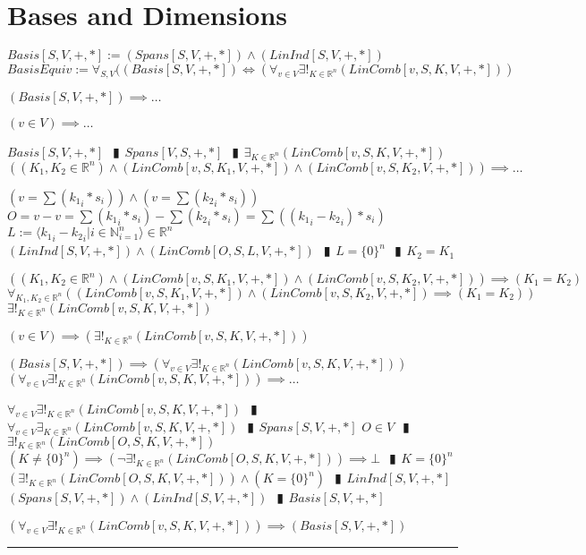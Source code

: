 \documentclass{book}
\newcommand{\abr}{:=}
\newcommand{\pipe}{$\phantom{(}\vrectangleblack\phantom{)}$}
\begin{document}
\section{Bases and Dimensions}
$Basis[S, V, +, *] \abr (Spans[S, V, +, *]) \land (LinInd[S, V, +, *])$ \\

$BasisEquiv \abr \forall_{S, V}((Basis[S, V, +, *]) \iff (\forall_{v \in V} \exists!_{K \in \mathbb{R}^n}(LinComb[v, S, K, V, +, *]))$
\begin{enumerate}
  \lit $(Basis[S, V, +, *]) \implies \ldots$
  \begin{enumerate}
    \lit $(v \in V) \implies \ldots$
    \begin{enumerate}
      \lit $Basis[S, V, +, *]$ \pipe $Spans[V, S, +, *]$ \pipe $\exists_{K \in \mathbb{R}^n}(LinComb[v, S, K, V, +, *])$
      \lit $((K_1, K_2 \in \mathbb{R}^n) \land (LinComb[v, S, K_1, V, +, *]) \land (LinComb[v, S, K_2, V, +, *])) \implies \ldots$
      \begin{enumerate}
        \lit $(v = \sum({k_1}_i * s_i)) \land (v = \sum({k_2}_i * s_i))$
        \lit $O = v - v = \sum({k_1}_i * s_i) - \sum({k_2}_i * s_i) = \sum(({k_1}_i - {k_2}_i) * s_i)$
        \lit $L \abr \langle {k_1}_i - {k_2}_i | i \in \mathbb{N}_{i = 1}^n \rangle \in \mathbb{R}^n$
        \lit $(LinInd[S, V, +, *]) \land (LinComb[O, S, L, V, +, *])$ \pipe $L = \{0\}^n$ \pipe $K_2 = K_1$
      \end{enumerate}
      \lit $((K_1, K_2 \in \mathbb{R}^n) \land (LinComb[v, S, K_1, V, +, *]) \land (LinComb[v, S, K_2, V, +, *])) \implies (K_1 = K_2)$
      \lit $\forall_{K_1, K_2 \in \mathbb{R}^n}((LinComb[v, S, K_1, V, +, *]) \land (LinComb[v, S, K_2, V, +, *]) \implies (K_1 = K_2))$
      \lit $\exists!_{K \in \mathbb{R}^n}(LinComb[v, S, K, V, +, *])$
    \end{enumerate}
    \lit $(v \in V) \implies (\exists!_{K \in \mathbb{R}^n}(LinComb[v, S, K, V, +, *]))$
    \end{enumerate}
  \lit $(Basis[S, V, +, *]) \implies (\forall_{v \in V} \exists!_{K \in \mathbb{R}^n}(LinComb[v, S, K, V, +, *]))$
  \lit $(\forall_{v \in V} \exists!_{K \in \mathbb{R}^n}(LinComb[v, S, K, V, +, *])) \implies \ldots$
  \begin{enumerate}
    \lit $\forall_{v \in V} \exists!_{K \in \mathbb{R}^n}(LinComb[v, S, K, V, +, *])$ \pipe $\forall_{v \in V} \exists_{K \in \mathbb{R}^n}(LinComb[v, S, K, V, +, *])$ \pipe $Spans[S, V, +, *]$
    \lit $O \in V$ \pipe $\exists!_{K \in \mathbb{R}^n}(LinComb[O, S, K, V, +, *])$
    \lit $(K \neq \{0\}^n) \implies (\lnot \exists!_{K \in \mathbb{R}^n}(LinComb[O, S, K, V, +, *])) \implies \bot$ \pipe $K = \{0\}^n$
    \lit $(\exists!_{K \in \mathbb{R}^n}(LinComb[O, S, K, V, +, *])) \land (K = \{0\}^n)$ \pipe $LinInd[S, V, +, *]$
    \lit $(Spans[S, V, +, *]) \land (LinInd[S, V, +, *])$ \pipe $Basis[S, V, +, *]$
  \end{enumerate}
  \lit $(\forall_{v \in V} \exists!_{K \in \mathbb{R}^n}(LinComb[v, S, K, V, +, *])) \implies (Basis[S, V, +, *])$
\end{enumerate} \vspace{.75mm} \hrule \vspace{.75mm} \ \\ 
\end{document}
